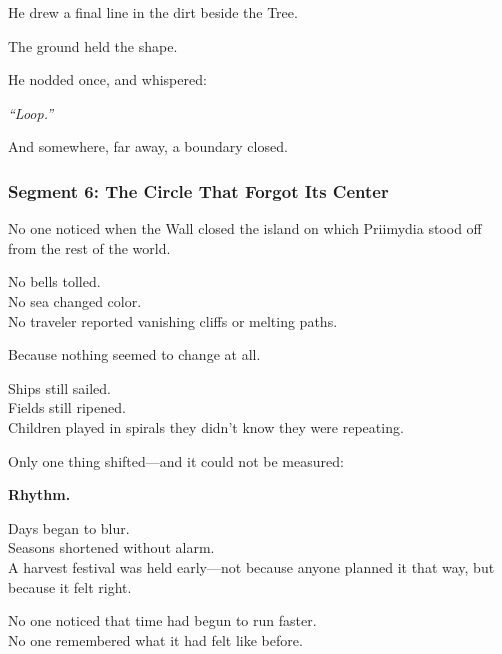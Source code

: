 \documentclass[9pt]{article}
\begin{document}
\vspace{0.5em}
He drew a final line in the dirt beside the Tree.

\vspace{0.5em}
The ground held the shape.

\vspace{0.5em}
He nodded once, and whispered:

\vspace{0.5em}
\textit{``Loop.''}

\vspace{0.5em}
And somewhere, far away, a boundary closed.

\newpage

\subsubsection*{Segment 6: The Circle That Forgot Its Center}

No one noticed when the Wall closed the island on which Priimydia stood off from the rest of the world.

\vspace{0.5em}
No bells tolled.\\
No sea changed color.\\
No traveler reported vanishing cliffs or melting paths.

\vspace{0.5em}
Because nothing seemed to change at all.

\vspace{0.5em}
Ships still sailed.\\
Fields still ripened.\\
Children played in spirals they didn’t know they were repeating.

\vspace{0.5em}
Only one thing shifted---and it could not be measured:

\vspace{0.5em}
\textbf{Rhythm.}

\vspace{0.5em}
Days began to blur.\\
Seasons shortened without alarm.\\
A harvest festival was held early---not because anyone planned it that way, but because it felt right.

\vspace{0.5em}
No one noticed that time had begun to run faster.\\
No one remembered what it had felt like before.
\end{document}
